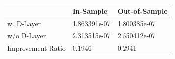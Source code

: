 \begin{tabular}{lll}
\toprule
 & In-Sample & Out-of-Sample \\
\midrule
w. D-Layer & 1.863391e-07 & 1.800385e-07 \\
w/o D-Layer & 2.313515e-07 & 2.550412e-07 \\
Improvement Ratio & 0.1946 & 0.2941 \\
\bottomrule
\end{tabular}
